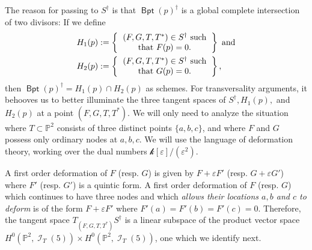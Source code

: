 \documentclass[reqno, 11pt]{amsart}
\theoremstyle{plain}
\theoremstyle{remark}
\renewcommand{\P}{\mathbb{P}}
\renewcommand{\k}{\mathscr{k}}
\DeclareMathOperator{\I}{\mathcal{I}}
\DeclareMathOperator{\BP}{\mathsf{Bpt}}
\begin{document}
The reason for passing to $S^{\dagger}$ is that $\BP(p)^{\dagger}$ is a global complete intersection of two divisors: If we define 
\begin{eqnarray*}
    H_{1}(p) &:= \left\{\begin{tabular}{c}
         $(F,G,T,T^{*}) \in S^{\dagger}$ such\\ that
         $F(p)=0$.\\ 
    \end{tabular} \right\} \text{ and}\\
    H_{2}(p) &:= \left\{\begin{tabular}{c}
         $(F,G,T,T^{*}) \in S^{\dagger}$ such\\ that
         $G(p)=0$.\\ 
    \end{tabular} \right\} \text{,}
\end{eqnarray*}
    then $\BP(p)^{\dagger} = H_{1}(p) \cap H_{2}(p)$ as schemes. 
 For transversality arguments, it behooves us to better illuminate the three tangent spaces of $S^{\dagger}, H_{1}(p),$ and $H_{2}(p)$ at a point $(F,G,T,T^{*})$.  We will only need to analyze the situation where $T \subset \P^{2}$ consists of three distinct points $\{a,b,c\}$, and where $F$ and $G$ possess only ordinary nodes at $a,b,c$.  We will use the language of deformation theory, working over the dual numbers $\k[\varepsilon]/(\varepsilon^{2})$. 
    
    A first order deformation of $F$ (resp. $G$) is given by $F + \varepsilon F'$ (resp. $G + \varepsilon G'$) where $F'$ (resp. $G'$) is a quintic form.  A first order deformation of $F$ (resp. $G$) which continues to have three nodes and which  \emph{allows their locations  $a,b$ and $c$ to deform} is of the form $F + \varepsilon F'$ where $F'(a)=F'(b) = F'(c) = 0$. Therefore, the tangent space $T_{(F,G,T,T^{*})}S^{\dagger}$ is a linear subspace of the product vector space $H^{0}\left(\P^{2},\I_{T}(5)\right) \times H^{0}\left(\P^{2},\I_{T}(5)\right)$, one  which we identify next.
\end{document}
